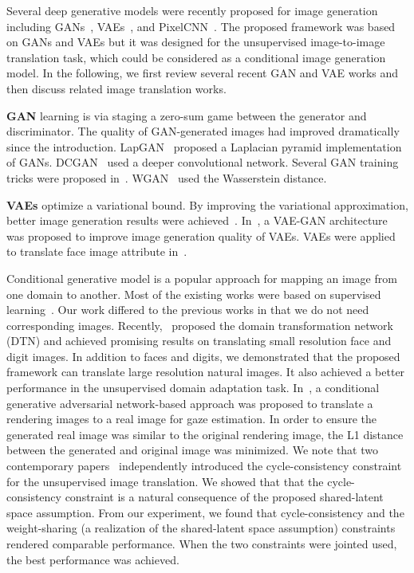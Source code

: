 \documentclass{article}
\begin{document}
Several deep generative models were recently proposed for image generation including GANs~\cite{goodfellow2014generative}, VAEs~\cite{kingma2013auto,rezende2014stochastic}, and  PixelCNN~\cite{van2016conditional}. The proposed framework was based on GANs and VAEs but it was designed for the unsupervised image-to-image translation task, which could be considered as a conditional image generation model. In the following, we first review several recent GAN and VAE works and then discuss related image translation works.

{\bf GAN} learning is via staging a zero-sum game between the generator and discriminator. The quality of GAN-generated images had improved dramatically since the introduction. LapGAN~\cite{denton2015deep} proposed a Laplacian pyramid implementation of GANs. DCGAN~\cite{radford2015unsupervised} used a deeper convolutional network. Several GAN training tricks were proposed in~\cite{salimans2016improved}. WGAN~\cite{arjovsky2017wasserstein} used the Wasserstein distance.

{\bf VAEs} optimize a variational bound. By improving the variational approximation, better image generation results were achieved~\cite{maaloe2016auxiliary,kingma2016improving}. In~\cite{larsen2015autoencoding}, a VAE-GAN architecture was proposed to improve image generation quality of VAEs. VAEs were applied to translate face image attribute in~\cite{yan2015attribute2image}. 

Conditional generative model is a popular approach for mapping an image from one domain to another. Most of the existing works were based on supervised learning~\cite{ledig2016photo,isola2016image,johnson2016perceptual}. Our work differed to the previous works in that we do not need corresponding images. Recently,~\cite{taigman2016unsupervised} proposed the domain transformation network (DTN) and achieved promising results on translating small resolution face and digit images. In addition to faces and digits, we demonstrated that the proposed framework can translate large resolution natural images. It also achieved a better performance in the unsupervised domain adaptation task. In~\cite{shrivastava2016learning}, a conditional generative adversarial network-based approach was proposed to translate a rendering images to a real image for gaze estimation. In order to ensure the generated real image was similar to the original rendering image, the L1 distance between the generated and original image was minimized. We note that two contemporary papers~\cite{zhu2017unpaired,kim2017learning} independently introduced the cycle-consistency constraint for the unsupervised image translation. We showed that that the cycle-consistency constraint is a natural consequence of the proposed shared-latent space assumption. From our experiment, we found that cycle-consistency and the weight-sharing (a realization of the shared-latent space assumption) constraints rendered comparable performance. When the two constraints were jointed used, the best performance was achieved.
\end{document}
